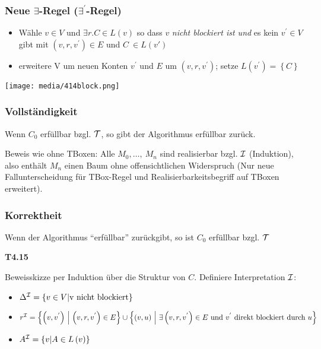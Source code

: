\subsubsection{\texorpdfstring{Neue $\exists$-Regel
($\exists^{'}$-Regel)}{Neue \textbackslash{}exists-Regel (\textbackslash{}exists\^{}\{'\}-Regel)}}\label{neue-exists-regel-exists-regel}

\begin{itemize}
\item
  Wähle $v \in V$ und $\exists r.C \in L\left( v \right)$ so dass
  $v$ \emph{nicht blockiert ist und} es kein $v^{'} \in V$ gibt mit
  $\left( v,r,v^{'} \right) \in E$ und $C\  \in L\left( v' \right)$
\item
  erweitere V um neuen Konten $v^{'}$ und $E$ um
  $\left( v,r,v^{'} \right)$; setze
  $L\left( v^{'} \right) = \left\{ C \right\}$
\end{itemize}

\texttt{[image: media/414block.png]}

\subsubsection{Vollständigkeit}\label{vollstuxe4ndigkeit}

\begin{proposition}
Wenn $C_0$ erfüllbar bzgl. $\mathcal{T}$, so gibt der Algorithmus erfüllbar zurück.
\end{proposition}

Beweis wie ohne TBoxen: Alle $M_{0},\ldots,\ M_{n}$ sind realisierbar
bzgl. $\mathcal{I}$ (Induktion), also enthält $M_{n}$ einen Baum ohne
offensichtlichen Widerspruch (Nur neue Fallunterscheidung für TBox-Regel und Realisierbarkeitsbegriff auf TBoxen erweitert).

\subsubsection{Korrektheit}\label{korrektheit}

\begin{proposition}
    Wenn der Algorithmus \enquote{erfüllbar} zurückgibt, so ist $C_0$ erfüllbar bzgl. $\mathcal{T}$
\end{proposition}

\textbf{T4.15}

Beweisskizze per Induktion über die Struktur von $C$. Definiere
Interpretation $\mathcal{I}$:

\begin{itemize}
\item
  $\Delta^{\mathcal{I}} = \left\{ v \in V \middle| \text{v\ }\mathrm{\text{nicht\ blockiert}} \right\}$
\item
  $r^{\MI} = \left\{ \left( v,v^{'} \right)\  \middle| \ \left( v,r,v^{'} \right) \in E \right\} \cup \left\{ \left( v,u \right)\  \middle| \ \exists\left( v,r,v^{'} \right) \in E\mathrm{\ }\mathrm{\text{und}}\mathrm{\ }v^{'}\mathrm{\ }\mathrm{\text{direkt\ blockiert\ durch}}\mathrm{\ }u \right\}$
\item
  $A^{\mathcal{I}} = \left\{ v \middle| A \in L\left( v \right) \right\}$
\end{itemize}

